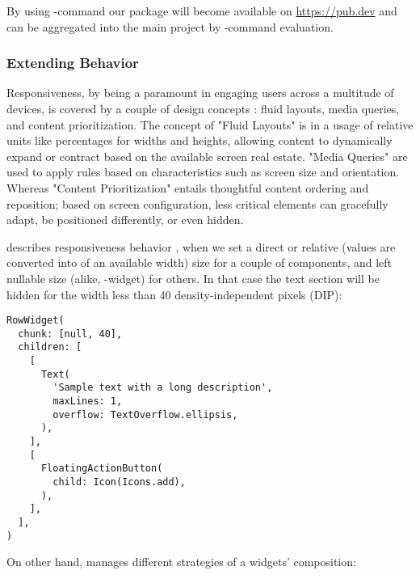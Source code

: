 \noindent By using -command our package will become available on 
\href{https://pub.dev}{https://pub.dev} and can be aggregated into the main project by 
-command evaluation.


\subsubsection{Extending Behavior}

Responsiveness, by being a paramount in engaging users across a multitude of devices, is covered by a couple of design 
concepts \cite{Frai22}: fluid layouts, media queries, and content prioritization. The concept of "Fluid Layouts" is in 
a usage of relative units like percentages for widths and heights, allowing content to dynamically expand or contract 
based on the available screen real estate. "Media Queries" are used to apply rules based on characteristics such as 
screen size and orientation. Whereas "Content Prioritization" entails thoughtful content ordering and reposition;
based on screen configuration, less critical elements can gracefully adapt, be positioned differently, or even hidden.

 describes responsiveness behavior ,  when we set a direct or 
relative (values  are converted into  of an available width) size for a couple of 
components, and left nullable size (alike, -widget) for others. In that case the text section will be hidden 
for the width less than 40 density-independent pixels (DIP):

\begin{lstlisting}
RowWidget(
  chunk: [null, 40],
  children: [
    [
      Text(
        'Sample text with a long description', 
        maxLines: 1,
        overflow: TextOverflow.ellipsis,
      ),
    ],
    [
      FloatingActionButton(
        child: Icon(Icons.add),
      ),
    ],
  ],
)
\end{lstlisting}

\noindent On other hand,  manages  different strategies of a widgets' composition: 

